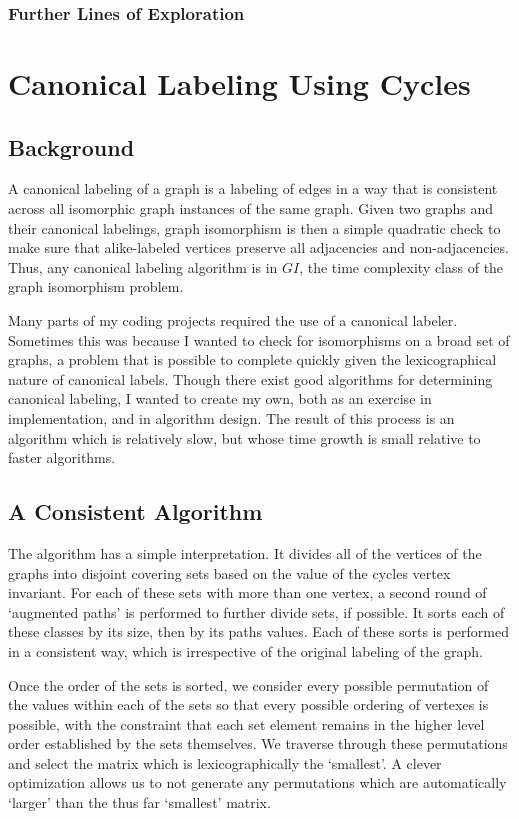 \documentclass[11pt,a4paper]{report}
\begin{document}
\subsection{Further Lines of Exploration}



\chapter{Canonical Labeling Using Cycles}
\section{Background}
A canonical labeling of a graph is a labeling of edges in a way that is consistent across all isomorphic graph instances of the same graph.
Given two graphs and their canonical labelings, graph isomorphism is then a simple quadratic check to make sure that alike-labeled vertices preserve all adjacencies and non-adjacencies. 
Thus, any canonical labeling algorithm is in $GI$, the time complexity class of the graph isomorphism problem.

Many parts of my coding projects required the use of a canonical labeler.
Sometimes this was because I wanted to check for isomorphisms on a broad set of graphs, a problem that is possible to complete quickly given the lexicographical nature of canonical labels.
Though there exist good algorithms for determining canonical labeling, I wanted to create my own, both as an exercise in implementation, and in algorithm design.
The result of this process is an algorithm which is relatively slow, but whose time growth is small relative to faster algorithms.

\section{A Consistent Algorithm}
The algorithm has a simple interpretation. 
It divides all of the vertices of the graphs into disjoint covering sets based on the value of the cycles vertex invariant.
For each of these sets with more than one vertex, a second round of `augmented paths' is performed to further divide sets, if possible.
It sorts each of these classes by its size, then by its paths values.
Each of these sorts is performed in a consistent way, which is irrespective of the original labeling of the graph.

Once the order of the sets is sorted, we consider every possible permutation of the values within each of the sets so that every possible ordering of vertexes is possible, with the constraint that each set element remains in the higher level order established by the sets themselves.
We traverse through these permutations and select the matrix which is lexicographically the `smallest'.
A clever optimization allows us to not generate any permutations which are automatically `larger' than the thus far `smallest' matrix.
\end{document}
